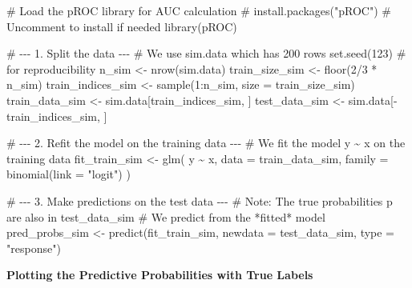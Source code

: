 \documentclass[
  letterpaper,
]{scrbook}
\newenvironment{Shaded}{\begin{snugshade}}{\end{snugshade}}
\newcommand{\AttributeTok}[1]{\textcolor[rgb]{0.40,0.45,0.13}{#1}}
\newcommand{\CommentTok}[1]{\textcolor[rgb]{0.37,0.37,0.37}{#1}}
\newcommand{\DecValTok}[1]{\textcolor[rgb]{0.68,0.00,0.00}{#1}}
\newcommand{\FunctionTok}[1]{\textcolor[rgb]{0.28,0.35,0.67}{#1}}
\newcommand{\NormalTok}[1]{\textcolor[rgb]{0.00,0.23,0.31}{#1}}
\newcommand{\OtherTok}[1]{\textcolor[rgb]{0.00,0.23,0.31}{#1}}
\newcommand{\SpecialCharTok}[1]{\textcolor[rgb]{0.37,0.37,0.37}{#1}}
\newcommand{\StringTok}[1]{\textcolor[rgb]{0.13,0.47,0.30}{#1}}
\begin{document}
\begin{Shaded}
\begin{Highlighting}[]
\CommentTok{\# Load the pROC library for AUC calculation}
\CommentTok{\# install.packages("pROC") \# Uncomment to install if needed}
\FunctionTok{library}\NormalTok{(pROC)}

\CommentTok{\# {-}{-}{-} 1. Split the data {-}{-}{-}}
\CommentTok{\# We use \textquotesingle{}sim.data\textquotesingle{} which has 200 rows}
\FunctionTok{set.seed}\NormalTok{(}\DecValTok{123}\NormalTok{) }\CommentTok{\# for reproducibility}
\NormalTok{n\_sim }\OtherTok{\textless{}{-}} \FunctionTok{nrow}\NormalTok{(sim.data)}
\NormalTok{train\_size\_sim }\OtherTok{\textless{}{-}} \FunctionTok{floor}\NormalTok{(}\DecValTok{2}\SpecialCharTok{/}\DecValTok{3} \SpecialCharTok{*}\NormalTok{ n\_sim)}
\NormalTok{train\_indices\_sim }\OtherTok{\textless{}{-}} \FunctionTok{sample}\NormalTok{(}\DecValTok{1}\SpecialCharTok{:}\NormalTok{n\_sim, }\AttributeTok{size =}\NormalTok{ train\_size\_sim)}
\NormalTok{train\_data\_sim }\OtherTok{\textless{}{-}}\NormalTok{ sim.data[train\_indices\_sim, ]}
\NormalTok{test\_data\_sim  }\OtherTok{\textless{}{-}}\NormalTok{ sim.data[}\SpecialCharTok{{-}}\NormalTok{train\_indices\_sim, ]}

\CommentTok{\# {-}{-}{-} 2. Refit the model on the training data {-}{-}{-}}
\CommentTok{\# We fit the model y \textasciitilde{} x on the training data}
\NormalTok{fit\_train\_sim }\OtherTok{\textless{}{-}} \FunctionTok{glm}\NormalTok{(}
\NormalTok{  y }\SpecialCharTok{\textasciitilde{}}\NormalTok{ x,}
  \AttributeTok{data =}\NormalTok{ train\_data\_sim,}
  \AttributeTok{family =} \FunctionTok{binomial}\NormalTok{(}\AttributeTok{link =} \StringTok{"logit"}\NormalTok{)}
\NormalTok{)}

\CommentTok{\# {-}{-}{-} 3. Make predictions on the test data {-}{-}{-}}
\CommentTok{\# Note: The true probabilities \textquotesingle{}p\textquotesingle{} are also in test\_data\_sim}
\CommentTok{\# We predict from the *fitted* model}
\NormalTok{pred\_probs\_sim }\OtherTok{\textless{}{-}} \FunctionTok{predict}\NormalTok{(fit\_train\_sim, }\AttributeTok{newdata =}\NormalTok{ test\_data\_sim, }\AttributeTok{type =} \StringTok{"response"}\NormalTok{)}
\end{Highlighting}
\end{Shaded}

\textbf{Plotting the Predictive Probabilities with True Labels}
\end{document}

